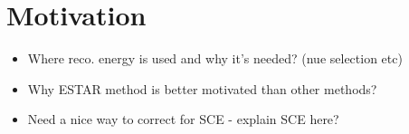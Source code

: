 \chapter{Motivation}
\label{chap:Motivation}

\begin{itemize}
    \item Where reco. energy is used and why it's needed? (nue selection etc)
    \item Why ESTAR method is better motivated than other methods?
    \item Need a nice way to correct for SCE - explain SCE here? 
\end{itemize}